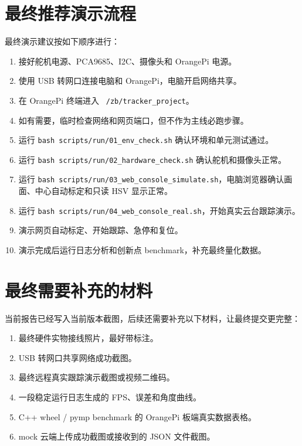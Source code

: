 \documentclass[
  oneside,
  degree=bachelor,
  field=science,
  fullwidthstop=circle,
  fontset=windows,
  times=false,
  minted=false,
  biblatex=false,
  algo=algpseudocode,
]{tongjithesis}
\newcommand{\code}[1]{\texttt{#1}}
\begin{document}
\section{最终推荐演示流程}

最终演示建议按如下顺序进行：

\begin{enumerate}
  \item 接好舵机电源、PCA9685、I2C、摄像头和 OrangePi 电源。
  \item 使用 USB 转网口连接电脑和 OrangePi，电脑开启网络共享。
  \item 在 OrangePi 终端进入 \code{~/zb/tracker\_project}。
  \item 如有需要，临时检查网络和网页端口，但不作为主线必跑步骤。
  \item 运行 \code{bash scripts/run/01\_env\_check.sh} 确认环境和单元测试通过。
  \item 运行 \code{bash scripts/run/02\_hardware\_check.sh} 确认舵机和摄像头正常。
  \item 运行 \code{bash scripts/run/03\_web\_console\_simulate.sh}，电脑浏览器确认画面、中心自动标定和只读 HSV 显示正常。
  \item 运行 \code{bash scripts/run/04\_web\_console\_real.sh}，开始真实云台跟踪演示。
  \item 演示网页自动标定、开始跟踪、急停和复位。
  \item 演示完成后运行日志分析和创新点 benchmark，补充最终量化数据。
\end{enumerate}

\section{最终需要补充的材料}

当前报告已经写入当前版本截图，后续还需要补充以下材料，让最终提交更完整：

\begin{enumerate}
  \item 最终硬件实物接线照片，最好带标注。
  \item USB 转网口共享网络成功截图。
  \item 最终远程真实跟踪演示截图或视频二维码。
  \item 一段稳定运行日志生成的 FPS、误差和角度曲线。
  \item C++ wheel / pymp benchmark 的 OrangePi 板端真实数据表格。
  \item mock 云端上传成功截图或接收到的 JSON 文件截图。
\end{enumerate}
\end{document}
